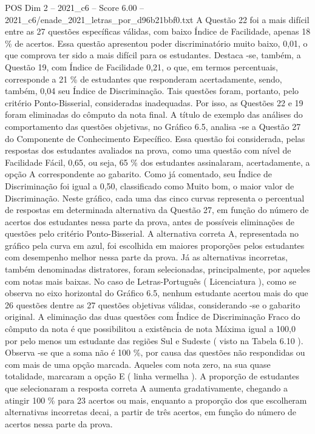 \begin{textsample}{POS Dim 2 – 2021\_c6 – Score 6.00 – 2021\_c6/enade\_2021\_letras\_por\_d96b21bbf0.txt}
A Questão 22 foi a mais difícil entre as 27 questões específicas válidas, com baixo Índice de Facilidade, apenas 18 \% de acertos.
Essa questão apresentou poder discriminatório muito baixo, 0,01, o que comprova ter sido a mais difícil para os estudantes.
Destaca -se, também, a Questão 19, com Índice de Facilidade 0,21, o que, em termos percentuais, corresponde a 21 \% de estudantes que responderam acertadamente, sendo, também, 0,04 seu Índice de Discriminação.
Tais questões foram, portanto, pelo critério Ponto-Bisserial, consideradas inadequadas.
Por isso, as Questões 22 e 19 foram eliminadas do cômputo da nota final.
A título de exemplo das análises do comportamento das questões objetivas, no Gráfico 6.5, analisa -se a Questão 27 do Componente de Conhecimento Específico.
Essa questão foi considerada, pelas respostas dos estudantes avaliados na prova, como uma questão com nível de Facilidade Fácil, 0,65, ou seja, 65 \% dos estudantes assinalaram, acertadamente, a opção A correspondente ao gabarito.
Como já comentado, seu Índice de Discriminação foi igual a 0,50, classificado como Muito bom, o maior valor de Discriminação.
Neste gráfico, cada uma das cinco curvas representa o percentual de respostas em determinada alternativa da Questão 27, em função do número de acertos dos estudantes nessa parte da prova, antes de possíveis eliminações de questões pelo critério Ponto-Bisserial.
A alternativa correta A, representada no gráfico pela curva em azul, foi escolhida em maiores proporções pelos estudantes com desempenho melhor nessa parte da prova.
Já as alternativas incorretas, também denominadas distratores, foram selecionadas, principalmente, por aqueles com notas mais baixas.
No caso de Letras-Português ( Licenciatura ), como se observa no eixo horizontal do Gráfico 6.5, nenhum estudante acertou mais do que 26 questões dentre as 27 questões objetivas válidas, considerando -se o gabarito original.
A eliminação das duas questões com Índice de Discriminação Fraco do cômputo da nota é que possibilitou a existência de nota Máxima igual a 100,0 por pelo menos um estudante das regiões Sul e Sudeste ( visto na Tabela 6.10 ).
Observa -se que a soma não é 100 \%, por causa das questões não respondidas ou com mais de uma opção marcada.
Aqueles com nota zero, na sua quase totalidade, marcaram a opção E ( linha vermelha ).
A proporção de estudantes que selecionaram a resposta correta A aumenta gradativamente, chegando a atingir 100 \% para 23 acertos ou mais, enquanto a proporção dos que escolheram alternativas incorretas decai, a partir de três acertos, em função do número de acertos nessa parte da prova.

\end{textsample}
